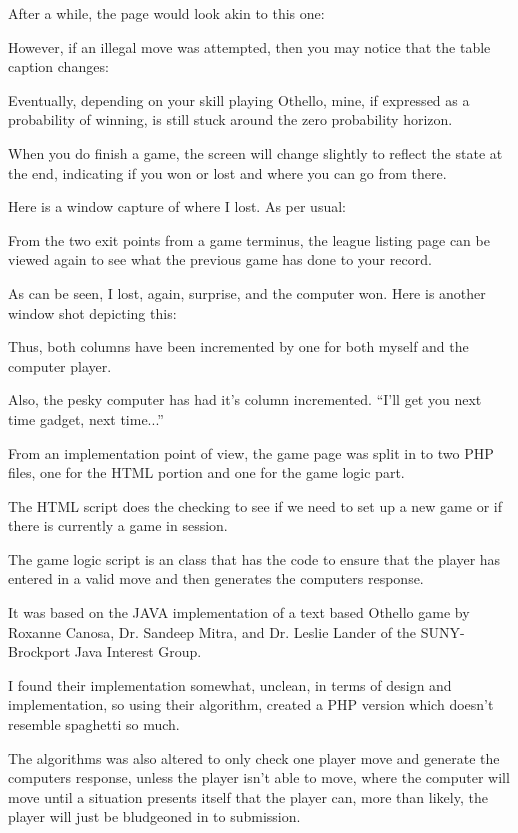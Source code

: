 \subitems	After a while, the page would look akin to this one:


\subitems	However, if an illegal move was attempted, then you may notice that the table caption changes:


\items	Eventually, depending on your skill playing Othello, mine, if expressed as a probability of winning, is still stuck around the zero probability horizon.

\subitems	When you do finish a game, the screen will change slightly to reflect the state at the end, indicating if you won or lost and where you can go from there.

\subitems	Here is a window capture of where I lost. As per usual:


\items	From the two exit points from a game terminus, the league listing page can be viewed again to see what the previous game has done to your record.

\subitems	As can be seen, I lost, again, surprise, and the computer won. Here is another window shot depicting this:


\subitems	Thus, both  columns have been incremented by one for both myself and the computer player.

\subitems	Also, the pesky computer has had it's  column incremented. ``I'll get you next time gadget, next time...''

\items	From an implementation point of view, the game page was split in to two PHP files, one for the HTML portion and one for the game logic part.

\items	The HTML script does the checking to see if we need to set up a new game or if there is currently a game in session.


\items	The game logic script is an class that has the code to ensure that the player has entered in a valid move and then generates the computers response.

\items	It was based on the JAVA implementation of a text based Othello game by Roxanne Canosa, Dr. Sandeep Mitra, and Dr. Leslie Lander of the SUNY-Brockport Java Interest Group.

\items	I found their implementation somewhat, unclean, in terms of design and implementation, so using their algorithm, created a PHP version which doesn't resemble spaghetti so much.

\items	The algorithms was also altered to only check one player move and generate the computers response, unless the player isn't able to move, where the computer will move until a situation presents itself that the player can, more than likely, the player will just be bludgeoned in to submission.


\bye
